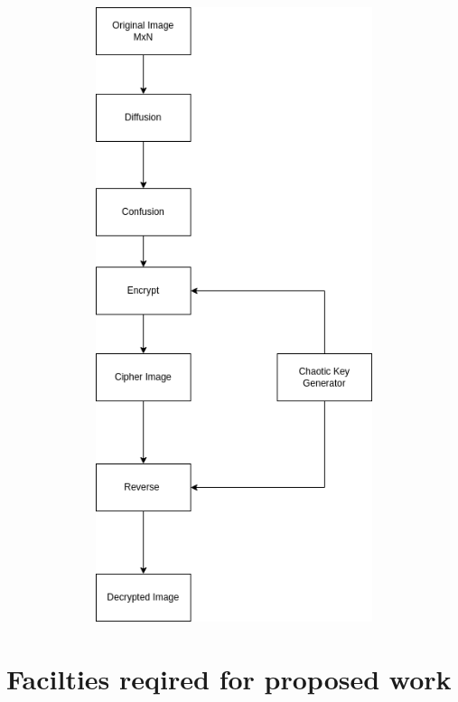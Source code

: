 \documentclass[11pt,a4paper,english]{article}
\begin{document}
\includegraphics[height=18cm,width=15cm]{graph}
\newpage
\section{Facilties reqired for proposed work}
\end{document}
